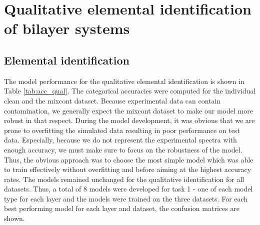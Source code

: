 \section{Qualitative elemental identification of bilayer systems}
\subsection{Elemental identification}
The model performance for the qualitative elemental identification is shown in Table \ref{tab:acc_qual}. The categorical accuracies were computed for the individual clean and the mixcont dataset. Because experimental data can contain contamination, we generally expect the mixcont dataset to make our model more robust in that respect.
During the model development, it was obvious that we are prone to overfitting the simulated data resulting in poor performance on test data. Especially, because we do not represent the experimental spectra with enough accuracy, we must make sure to focus on the robustness of the model. Thus, the obvious approach was to choose the most simple model which was able to train effectively without overfitting and before aiming at the highest accuracy rates. The models remained unchanged for the qualitative identification for all datasets. Thus, a total of 8 models were developed for task 1 - one of each model type for each layer and the models were trained on the three datasets. For each best performing model for each layer and dataset, the confusion matrices are shown.


